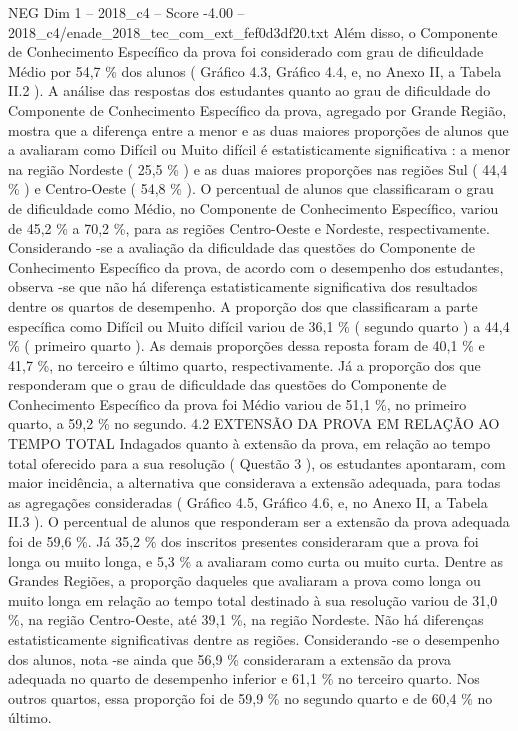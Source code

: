 \begin{textsample}{NEG Dim 1 – 2018\_c4 – Score -4.00 – 2018\_c4/enade\_2018\_tec\_com\_ext\_fef0d3df20.txt}
Além disso, o Componente de Conhecimento Específico da prova foi considerado com grau de dificuldade Médio por 54,7 \% dos alunos ( Gráfico 4.3, Gráfico 4.4, e, no Anexo II, a Tabela II.2 ).
A análise das respostas dos estudantes quanto ao grau de dificuldade do Componente de Conhecimento Específico da prova, agregado por Grande Região, mostra que a diferença entre a menor e as duas maiores proporções de alunos que a avaliaram como Difícil ou Muito difícil é estatisticamente significativa : a menor na região Nordeste ( 25,5 \% ) e as duas maiores proporções nas regiões Sul ( 44,4 \% ) e Centro-Oeste ( 54,8 \% ).
O percentual de alunos que classificaram o grau de dificuldade como Médio, no Componente de Conhecimento Específico, variou de 45,2 \% a 70,2 \%, para as regiões Centro-Oeste e Nordeste, respectivamente.
Considerando -se a avaliação da dificuldade das questões do Componente de Conhecimento Específico da prova, de acordo com o desempenho dos estudantes, observa -se que não há diferença estatisticamente significativa dos resultados dentre os quartos de desempenho.
A proporção dos que classificaram a parte específica como Difícil ou Muito difícil variou de 36,1 \% ( segundo quarto ) a 44,4 \% ( primeiro quarto ).
As demais proporções dessa reposta foram de 40,1 \% e 41,7 \%, no terceiro e último quarto, respectivamente.
Já a proporção dos que responderam que o grau de dificuldade das questões do Componente de Conhecimento Específico da prova foi Médio variou de 51,1 \%, no primeiro quarto, a 59,2 \% no segundo. 4.2 EXTENSÃO DA PROVA EM RELAÇÃO AO TEMPO TOTAL Indagados quanto à extensão da prova, em relação ao tempo total oferecido para a sua resolução ( Questão 3 ), os estudantes apontaram, com maior incidência, a alternativa que considerava a extensão adequada, para todas as agregações consideradas ( Gráfico 4.5, Gráfico 4.6, e, no Anexo II, a Tabela II.3 ).
O percentual de alunos que responderam ser a extensão da prova adequada foi de 59,6 \%.
Já 35,2 \% dos inscritos presentes consideraram que a prova foi longa ou muito longa, e 5,3 \% a avaliaram como curta ou muito curta.
Dentre as Grandes Regiões, a proporção daqueles que avaliaram a prova como longa ou muito longa em relação ao tempo total destinado à sua resolução variou de 31,0 \%, na região Centro-Oeste, até 39,1 \%, na região Nordeste.
Não há diferenças estatisticamente significativas dentre as regiões.
Considerando -se o desempenho dos alunos, nota -se ainda que 56,9 \% consideraram a extensão da prova adequada no quarto de desempenho inferior e 61,1 \% no terceiro quarto.
Nos outros quartos, essa proporção foi de 59,9 \% no segundo quarto e de 60,4 \% no último.

\end{textsample}
